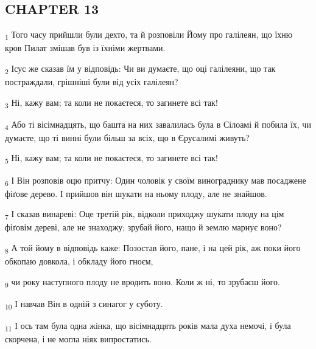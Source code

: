 \subsection{CHAPTER 13}
\begin{tcolorbox}
\textsubscript{1} Того часу прийшли були дехто, та й розповіли Йому про галілеян, що їхню кров Пилат змішав був із їхніми жертвами.
\end{tcolorbox}
\begin{tcolorbox}
\textsubscript{2} Ісус же сказав їм у відповідь: Чи ви думаєте, що оці галілеяни, що так постраждали, грішніші були від усіх галілеян?
\end{tcolorbox}
\begin{tcolorbox}
\textsubscript{3} Ні, кажу вам; та коли не покаєтеся, то загинете всі так!
\end{tcolorbox}
\begin{tcolorbox}
\textsubscript{4} Або ті вісімнадцять, що башта на них завалилась була в Сілоамі й побила їх, чи думаєте, що ті винні були більш за всіх, що в Єрусалимі живуть?
\end{tcolorbox}
\begin{tcolorbox}
\textsubscript{5} Ні, кажу вам; та коли не покаєтеся, то загинете всі так!
\end{tcolorbox}
\begin{tcolorbox}
\textsubscript{6} І Він розповів оцю притчу: Один чоловік у своїм винограднику мав посаджене фіґове дерево. І прийшов він шукати на ньому плоду, але не знайшов.
\end{tcolorbox}
\begin{tcolorbox}
\textsubscript{7} І сказав винареві: Оце третій рік, відколи приходжу шукати плоду на цім фіґовім дереві, але не знаходжу; зрубай його, нащо й землю марнує воно?
\end{tcolorbox}
\begin{tcolorbox}
\textsubscript{8} А той йому в відповідь каже: Позостав його, пане, і на цей рік, аж поки його обкопаю довкола, і обкладу його гноєм,
\end{tcolorbox}
\begin{tcolorbox}
\textsubscript{9} чи року наступного плоду не вродить воно. Коли ж ні, то зрубаєш його.
\end{tcolorbox}
\begin{tcolorbox}
\textsubscript{10} І навчав Він в одній з синагог у суботу.
\end{tcolorbox}
\begin{tcolorbox}
\textsubscript{11} І ось там була одна жінка, що вісімнадцять років мала духа немочі, і була скорчена, і не могла ніяк випростатись.
\end{tcolorbox}
